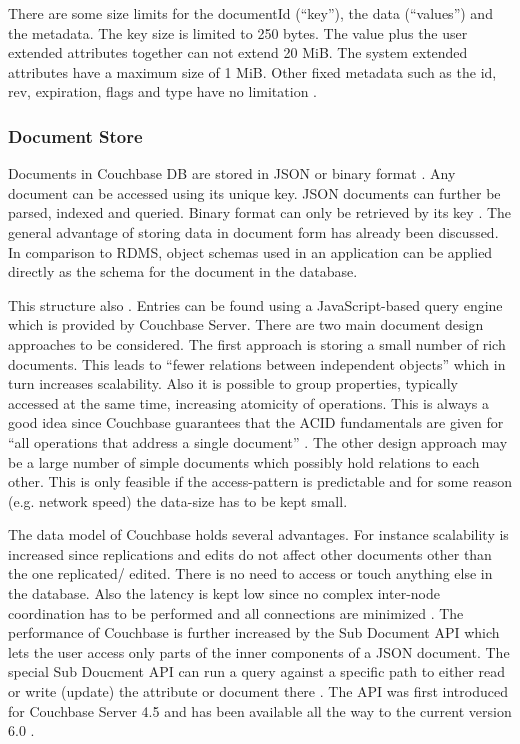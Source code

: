 There are some size limits for the documentId (\enquote{key}), the data (\enquote{values}) and the metadata. The key size is limited to 250 bytes. The value plus the user extended attributes together can not extend 20 MiB. The system extended attributes have a maximum size of 1 MiB. Other fixed metadata such as the id, rev, expiration, flags and type have no limitation \parencite{couchbaseDocuData}.
\subsubsection{Document Store}
Documents in Couchbase DB are stored in JSON \parencite{objelean} or binary format \parencite{couchbaseDocuData}. Any document can be accessed using its unique key. JSON documents can further be parsed, indexed and queried. Binary format can only be retrieved by its key \parencite{couchbaseDocuData}. The general advantage of storing data in document form has already been discussed. In comparison to RDMS, object schemas used in an application can be applied directly as the schema for the document in the database.

This structure also . Entries can be found using a JavaScript-based query engine which is provided by Couchbase Server. There are two main document design approaches to be considered. The first approach is storing a small number of rich documents. This leads to \enquote{fewer relations between independent objects} \parencite{couchbaseDocuDataModel} which in turn increases scalability. Also it is possible to group properties, typically accessed at the same time, increasing atomicity of operations. This is always a good idea since Couchbase guarantees that the ACID fundamentals are given for \enquote{all operations that address a single document} \parencite{couchbaseDocuDataModel}. The other design approach may be a large number of simple documents which possibly hold relations to each other. This is only feasible if the access-pattern is predictable and for some reason (e.g. network speed) the data-size has to be kept small.

The data model of Couchbase holds several advantages. For instance scalability is increased since replications and edits do not affect other documents other than the one replicated/ edited. There is no need to access or touch anything else in the database. Also the latency is kept low since no complex inter-node coordination has to be performed and all connections are minimized \parencite{couchbaseDocuDataModel}. The performance of Couchbase is further increased by the Sub Document API which lets the user access only parts of the inner components of a JSON document. The special Sub Doucment API can run a query against a specific path to either read or write (update) the attribute or document there \parencite{couchbaseDocuSubDoc}. The API was first introduced for Couchbase Server 4.5 and has been available all the way to the current version 6.0 \parencite{couchbaseDocuSubDoc}.
